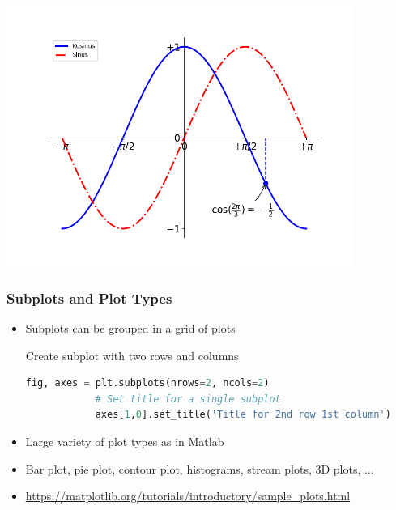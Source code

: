 \begin{frame}[fragile]
   \vspace{-1cm}
    \begin{center}
      \includegraphics[width=0.85\textwidth]{screenshots/plt-6.png}
    \end{center}						
\end{frame}

\begin{frame}[fragile]
	\frametitle{Subplots and Plot Types}
    \begin{itemize}
      \item Subplots can be grouped in a grid of plots
    \begin{block}{Create subplot with two rows and columns}
    \begin{lstlisting}[language=Python]
			fig, axes = plt.subplots(nrows=2, ncols=2)		
			# Set title for a single subplot
			axes[1,0].set_title('Title for 2nd row 1st column')
    \end{lstlisting}      
		\end{block}
      \item Large variety of plot types as in Matlab
      \item Bar plot, pie plot, contour plot, histograms, stream plots, 3D plots, $\ldots$ 
			\item \url{https://matplotlib.org/tutorials/introductory/sample_plots.html}
    \end{itemize}					
\end{frame}


